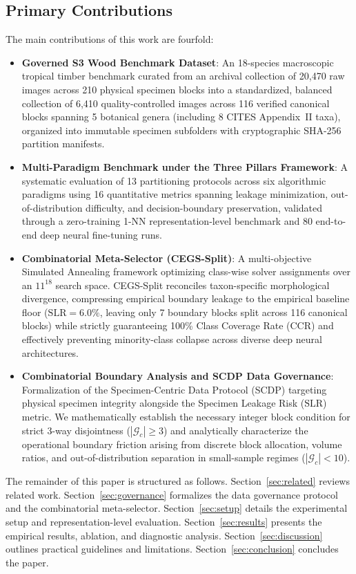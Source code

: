 \documentclass[a4paper,fleqn]{cas-sc}
\begin{document}
\subsection{Primary Contributions}
The main contributions of this work are fourfold:
\begin{itemize}
\item \textbf{Governed S3 Wood Benchmark Dataset}: An 18-species macroscopic tropical timber benchmark curated from an archival collection of 20,470 raw images across 210 physical specimen blocks into a standardized, balanced collection of 6,410 quality-controlled images across 116 verified canonical blocks spanning 5 botanical genera (including 8 CITES Appendix~II taxa), organized into immutable specimen subfolders with cryptographic SHA-256 partition manifests.
\item \textbf{Multi-Paradigm Benchmark under the Three Pillars Framework}: A systematic evaluation of 13 partitioning protocols across six algorithmic paradigms using 16 quantitative metrics spanning leakage minimization, out-of-distribution difficulty, and decision-boundary preservation, validated through a zero-training 1-NN representation-level benchmark and 80 end-to-end deep neural fine-tuning runs.
\item \textbf{Combinatorial Meta-Selector (CEGS-Split)}: A multi-objective Simulated Annealing framework optimizing class-wise solver assignments over an $11^{18}$ search space. CEGS-Split reconciles taxon-specific morphological divergence, compressing empirical boundary leakage to the empirical baseline floor ($\mathrm{SLR} = 6.0\%$, leaving only 7 boundary blocks split across 116 canonical blocks) while strictly guaranteeing 100\% Class Coverage Rate ($\mathrm{CCR}$) and effectively preventing minority-class collapse across diverse deep neural architectures.
\item \textbf{Combinatorial Boundary Analysis and SCDP Data Governance}: Formalization of the Specimen-Centric Data Protocol (SCDP) targeting physical specimen integrity alongside the Specimen Leakage Risk ($\mathrm{SLR}$) metric. We mathematically establish the necessary integer block condition for strict 3-way disjointness ($|\mathcal{G}_c| \ge 3$) and analytically characterize the operational boundary friction arising from discrete block allocation, volume ratios, and out-of-distribution separation in small-sample regimes ($|\mathcal{G}_c| < 10$).
\end{itemize}

The remainder of this paper is structured as follows. Section~\ref{sec:related} reviews related work. Section~\ref{sec:governance} formalizes the data governance protocol and the combinatorial meta-selector. Section~\ref{sec:setup} details the experimental setup and representation-level evaluation. Section~\ref{sec:results} presents the empirical results, ablation, and diagnostic analysis. Section~\ref{sec:discussion} outlines practical guidelines and limitations. Section~\ref{sec:conclusion} concludes the paper.
\end{document}

